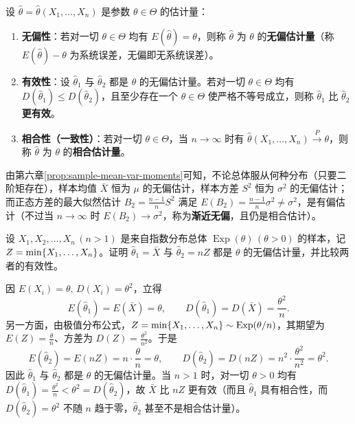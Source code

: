\begin{definition}
\label{def:estimator-criteria}
设 $\hat{\theta}=\hat{\theta}(X_1,\ldots,X_n)$ 是参数 $\theta\in\Theta$ 的估计量：
\begin{enumerate}
  \item \textbf{无偏性}：若对一切 $\theta\in\Theta$ 均有 $E(\hat{\theta})=\theta$，则称 $\hat{\theta}$ 为 $\theta$ 的\textbf{无偏估计量}（称 $E(\hat{\theta})-\theta$ 为系统误差，无偏即无系统误差）。
  \item \textbf{有效性}：设 $\hat{\theta}_1$ 与 $\hat{\theta}_2$ 都是 $\theta$ 的无偏估计量。若对一切 $\theta\in\Theta$ 均有 $D(\hat{\theta}_1)\le D(\hat{\theta}_2)$，且至少存在一个 $\theta\in\Theta$ 使严格不等号成立，则称 $\hat{\theta}_1$ 比 $\hat{\theta}_2$ \textbf{更有效}。
  \item \textbf{相合性（一致性）}：若对一切 $\theta\in\Theta$，当 $n\to\infty$ 时有 $\hat{\theta}(X_1,\ldots,X_n)\xrightarrow{P}\theta$，则称 $\hat{\theta}$ 为 $\theta$ 的\textbf{相合估计量}。
\end{enumerate}
\end{definition}

由第六章\cref{prop:sample-mean-var-moments}可知，不论总体服从何种分布（只要二阶矩存在），样本均值 $\bar{X}$ 恒为 $\mu$ 的无偏估计，样本方差 $S^2$ 恒为 $\sigma^2$ 的无偏估计；而正态方差的最大似然估计 $B_2=\frac{n-1}{n}S^2$ 满足 $E(B_2)=\frac{n-1}{n}\sigma^2\ne\sigma^2$，是有偏估计（不过当 $n\to\infty$ 时 $E(B_2)\to\sigma^2$，称为\textbf{渐近无偏}，且仍是相合估计）。

\begin{example}[title={指数分布参数的两个无偏估计量及其有效性比较}]
\label{eg:unbiased-efficient-exp}
设 $X_1,X_2,\ldots,X_n\,(n>1)$ 是来自指数分布总体 $\operatorname{Exp}(\theta)\,(\theta>0)$ 的样本，记 $Z=\min\{X_1,\ldots,X_n\}$。证明 $\hat{\theta}_1=\bar{X}$ 与 $\hat{\theta}_2=nZ$ 都是 $\theta$ 的无偏估计量，并比较两者的有效性。
\begin{solution}
因 $E(X_i)=\theta,\,D(X_i)=\theta^2$，立得
\[
  E(\hat{\theta}_1)=E(\bar{X})=\theta,\qquad
  D(\hat{\theta}_1)=D(\bar{X})=\frac{\theta^2}{n}.
\]
另一方面，由极值分布公式，$Z=\min\{X_1,\ldots,X_n\}\sim\operatorname{Exp}(\theta/n)$，其期望为 $E(Z)=\frac{\theta}{n}$、方差为 $D(Z)=\frac{\theta^2}{n^2}$。于是
\[
  E(\hat{\theta}_2)=E(nZ)=n\cdot\frac{\theta}{n}=\theta,\qquad
  D(\hat{\theta}_2)=D(nZ)=n^2\cdot\frac{\theta^2}{n^2}=\theta^2.
\]
因此 $\hat{\theta}_1$ 与 $\hat{\theta}_2$ 都是 $\theta$ 的无偏估计量。当 $n>1$ 时，对一切 $\theta>0$ 均有 $D(\hat{\theta}_1)=\frac{\theta^2}{n}<\theta^2=D(\hat{\theta}_2)$，故 $\bar{X}$ 比 $nZ$ 更有效（而且 $\hat{\theta}_1$ 具有相合性，而 $D(\hat{\theta}_2)=\theta^2$ 不随 $n$ 趋于零，$\hat{\theta}_2$ 甚至不是相合估计量）。
\end{solution}
\end{example}

